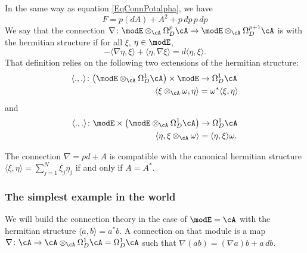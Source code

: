 In the same way as equation \eqref{EqConnPotalpha}, we have
\begin{equation}
F=p(dA)+A^2+p\,dp\,p\,dp
\end{equation}
We say that the connection $\nabla\colon \modE\otimes_{\cA}\Omega^p_D\cA\to \modE\otimes_{\cA}\Omega^{p+1}_D\cA$ is  with the hermitian structure if for all $\xi$, $\eta\in\modE$,
\begin{equation}
-\langle \nabla\eta, \xi\rangle +\langle \eta, \nabla\xi\rangle =d\langle \eta, \xi\rangle .
\end{equation}
That definition relies on the following two extensions of the hermitian structure:
\begin{equation}
\begin{aligned}
 \langle ., .\rangle \colon \big( \modE\otimes_{\cA}\Omega^1_D\cA \big)\times \modE&\to \Omega^1_D\cA \\ 
   \langle \xi\otimes_{\cA}\omega, \eta\rangle &=\omega^*\langle \xi, \eta\rangle  
\end{aligned}
\end{equation}
and
\begin{equation}
\begin{aligned}
  \langle ., .\rangle \colon \modE\times\big( \modE\otimes_{\cA}\Omega^1_D\cA \big)&\to \Omega^1_D\cA \\ 
   \langle \eta, \xi\otimes_{\cA}\omega\rangle &=\langle \eta, \xi\rangle \omega. 
\end{aligned}
\end{equation}

\begin{proposition}
The connection $\nabla=pd+A$ is compatible with the canonical hermitian structure $\langle \xi, \eta\rangle =\sum_{j=1}^{N}\xi_j\eta_j$ if and only if $A=A^*$.
\end{proposition}

\subsubsection{The simplest example in the world}	\label{ConnEequalAsime}

We will build the connection theory in the case of $\modE=\cA$ with the hermitian structure $\langle a, b\rangle =a^*b$. A connection on that module is a map $\nabla\colon \cA\to \cA\otimes_{\cA}\Omega^1_D\cA=\Omega^1_D\cA$ such that $\nabla(ab)=(\nabla a)b+a\,db$. 

